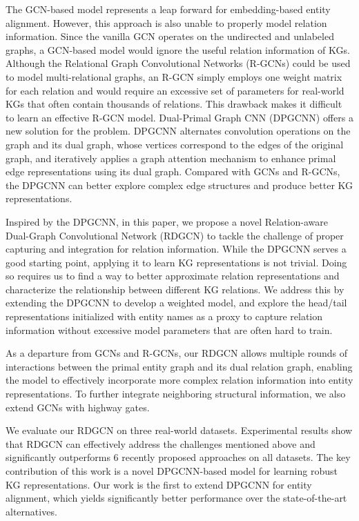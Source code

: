 \documentclass{article}
\begin{document}
The GCN-based model \cite{wang2018cross} represents a leap forward for embedding-based entity alignment. However, this approach is also unable to properly model relation information. Since the vanilla GCN operates on the undirected and unlabeled graphs, a GCN-based model would ignore the useful relation information of KGs. Although the Relational Graph Convolutional Networks (R-GCNs) \cite{schlichtkrull2018modeling} could be used to model multi-relational graphs, an R-GCN simply employs one weight matrix for each relation and would require an excessive set of parameters for real-world KGs that often contain thousands of relations. This drawback makes it difficult to learn an effective R-GCN model. Dual-Primal Graph CNN (DPGCNN) \cite{monti2018dual} offers a new solution for the problem. DPGCNN alternates convolution operations on the graph and its dual graph, whose vertices correspond to the edges of the original graph, and iteratively applies a graph attention mechanism to enhance primal edge representations using its dual graph. Compared with GCNs and R-GCNs, the DPGCNN can better explore complex edge structures and produce better KG representations.

Inspired by the DPGCNN, in this paper, we propose a novel Relation-aware Dual-Graph Convolutional Network (RDGCN) to tackle the challenge of proper capturing and integration for relation information. While the DPGCNN serves a good starting point, applying it to learn KG representations is not trivial. Doing so requires us to find a way to better approximate relation representations and characterize the relationship between different KG relations. We address this by extending the DPGCNN to develop a weighted model, and explore the head/tail representations initialized with entity names as a proxy to capture relation information without excessive model parameters that are often hard to train. 

As a departure from GCNs and R-GCNs, our RDGCN allows multiple rounds of interactions between the primal entity graph and its dual relation graph, enabling the
model to effectively incorporate more complex relation information into entity representations. To further integrate neighboring structural information, we also extend GCNs with highway gates. 

We evaluate our RDGCN on three real-world datasets. Experimental results show that RDGCN can effectively address the challenges mentioned above and significantly outperforms 6 recently proposed approaches on all datasets. The key contribution of this work is a novel DPGCNN-based model for learning robust KG representations. Our work is the first to extend DPGCNN for entity alignment, which yields significantly better performance over the state-of-the-art alternatives. 
\end{document}
